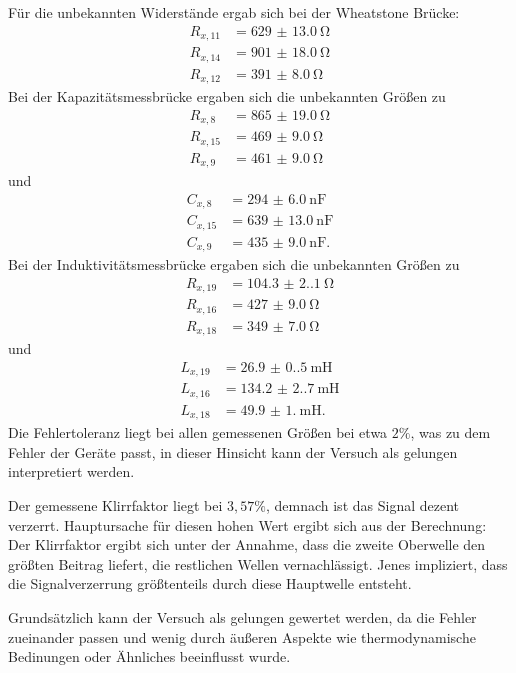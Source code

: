 \noindent Für die unbekannten Widerstände ergab sich bei der Wheatstone Brücke:
\begin{align*}
    R_{x,11} &= \qty{629(13.0)}{\ohm}\\
    R_{x,14} &= \qty{901(18.0)}{\ohm}\\
    R_{x,12} &= \qty{391(8.0)}{\ohm}
\end{align*}
Bei der Kapazitätsmessbrücke ergaben sich die unbekannten Größen zu
\begin{align*}
    R_{x,8}  &= \qty{865(19.0)}{\ohm}\\
    R_{x,15} &= \qty{469(9.0)}{\ohm}\\
    R_{x,9}  &= \qty{461(9.0)}{\ohm}
\end{align*}
und
\begin{align*}
    C_{x,8}  &= \qty{294(6.0)}{\nano\farad}\\
    C_{x,15} &= \qty{639(13.0)}{\nano\farad}\\
    C_{x,9}  &= \qty{435(9.0)}{\nano\farad}.
\end{align*}
Bei der Induktivitätsmessbrücke ergaben sich die unbekannten Größen zu 
\begin{align*}
    R_{x,19} &= \qty{104.3(2.1)}{\ohm}\\
    R_{x,16} &= \qty{427(9.0)}{\ohm}\\
    R_{x,18} &= \qty{349(7.0)}{\ohm}
\end{align*}
und
\begin{align*}
    L_{x,19} &= \qty{26.9(0.5)}{\milli\henry}\\
    L_{x,16} &= \qty{134.2(2.7)}{\milli\henry}\\
    L_{x,18} &= \qty{49.9(1.0)}{\milli\henry}.
\end{align*}
Die Fehlertoleranz liegt bei allen gemessenen Größen bei etwa $2 \%$, was zu 
dem Fehler der Geräte passt, in dieser Hinsicht kann der Versuch als gelungen 
interpretiert werden.
\par\vspace{0.5em}
\noindent Der gemessene Klirrfaktor liegt bei $3,57 \%$, demnach ist das Signal
dezent verzerrt. Hauptursache für diesen hohen Wert ergibt sich aus der Berechnung: 
Der Klirrfaktor ergibt sich unter der Annahme, dass die zweite Oberwelle den 
größten Beitrag liefert, die restlichen Wellen vernachlässigt. Jenes impliziert, 
dass die Signalverzerrung größtenteils durch diese Hauptwelle entsteht. 
\par\vspace{0.5em}
\noindent Grundsätzlich kann der Versuch als gelungen gewertet werden, da die 
Fehler zueinander passen und wenig durch äußeren Aspekte wie thermodynamische 
Bedinungen oder Ähnliches beeinflusst wurde.